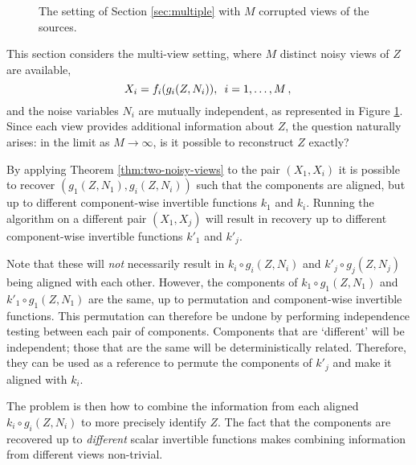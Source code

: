 \begin{figure}[t!]
	\centering
	\caption[Multi-view ICA with noisy views]{The setting of Section \ref{sec:multiple} with $M$ corrupted views of the sources.}
	\label{fig:generalized_hsr_many}
\end{figure}

This section considers the multi-view setting, where $M$ distinct noisy views of $Z$ are available,
\begin{equation*}
X_{i}={f}_{i}({g}_{i}(Z,N_{i})),\,\,\,i=1, \ldots, M\,, \label{eq:multi}\\
\end{equation*}
and the noise variables $N_{i}$ are mutually independent, as represented in Figure \ref{fig:generalized_hsr_many}.
Since each view provides additional information about $Z$, the question naturally arises: in the limit as $M \to \infty$, is it possible to reconstruct $Z$ exactly?


By applying Theorem \ref{thm:two-noisy-views} to the pair $({X}_1,X_i)$ it is possible to recover  $({g}_1(Z,N_1),{g}_i(Z,N_i))$ such that the components are aligned, but up to different component-wise invertible functions ${k}_1$ and ${k}_i$.
Running the algorithm on a different pair  $({X}_1,X_{j})$ will result in recovery up to different component-wise invertible functions $k'_1$ and $k'_j$.

Note that these will \emph{not} necessarily result in  ${k}_i\circ{g}_i(Z,N_i)$ and ${k}'_j\circ{g}_j(Z,N_j)$ being aligned with each other.
However, the components of ${k}_1\circ{g}_1(Z,N_1)$ and ${k}'_1\circ{g}_1(Z,N_1)$ are the same, up to permutation and component-wise invertible functions.
This permutation can therefore be undone by performing independence testing between each pair of components.
Components that are `different' will be independent; those that are the same will be deterministically related.
Therefore, they can be used as a reference to permute the components of ${k}'_j$ and make it aligned with ${k}_i$.

The problem is then how to combine the information from each aligned ${k}_i \circ {g}_i(Z,N_i)$ to more precisely identify $Z$.
The fact that the components are recovered up to \emph{different} scalar invertible functions makes combining information from different views non-trivial.


